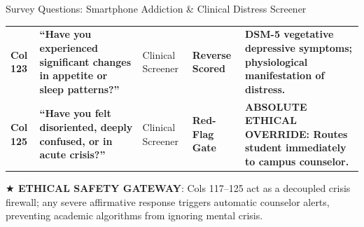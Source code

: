 \documentclass{beamer}
\begin{document}
\begin{frame}[t]{Survey Questions: Smartphone Addiction \& Clinical Distress Screener}
\begin{tcolorbox}[colback=white, colframe=BlueDeep, arc=1.2mm, boxrule=0.7pt, top=0.3mm, bottom=0.3mm, left=0.8mm, right=0.8mm]
\begin{tabularx}{\linewidth}{@{}p{0.7cm} p{4.2cm} p{1.6cm} p{1.6cm} X@{}}
      \rowcolor{GoldBG} \textbf{Col 123} & \textbf{``Have you experienced significant changes in appetite or sleep patterns?''} & Clinical Screener & \textbf{Reverse Scored} & \textbf{DSM-5 vegetative depressive symptoms; physiological manifestation of distress.} \\
      \rowcolor{GoldBG} \textbf{Col 125} & \textbf{``Have you felt disoriented, deeply confused, or in acute crisis?''} & Clinical Screener & \textbf{Red-Flag Gate} & \textbf{ABSOLUTE ETHICAL OVERRIDE: Routes student immediately to campus counselor.} \\
      \bottomrule
    \end{tabularx}
  \end{tcolorbox}
  \vspace{0.8mm}

  \begin{takeawaybanner}
    \fontsize{4.6pt}{5.6pt}\selectfont
    \textbf{\color{GoldPill}$\bigstar$ ETHICAL SAFETY GATEWAY}: Cols 117--125 act as a decoupled crisis firewall; any severe affirmative response triggers automatic counselor alerts, preventing academic algorithms from ignoring mental crisis.
  \end{takeawaybanner}
\end{frame}
\end{document}
